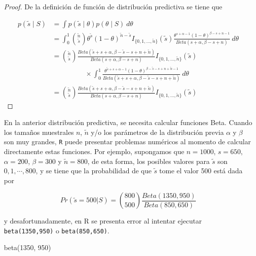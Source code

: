 \documentclass[
  10pt,
  spanish,
]{book}
\newenvironment{Shaded}{\begin{snugshade}}{\end{snugshade}}
\newcommand{\DecValTok}[1]{\textcolor[rgb]{0.00,0.00,0.81}{#1}}
\newcommand{\FunctionTok}[1]{\textcolor[rgb]{0.00,0.00,0.00}{#1}}
\newcommand{\NormalTok}[1]{#1}
\theoremstyle{definition}
\theoremstyle{definition}
\theoremstyle{definition}
\theoremstyle{definition}
\theoremstyle{remark}
\begin{document}
\begin{proof}
\iffalse{} {Prueba. } \fi{}De la definición de función de distribución predictiva se tiene que

\begin{align*}
p(\tilde{s} \mid S)&=\int p(\tilde{s} \mid \theta)p(\theta \mid S)\ d\theta\\
&=\int_0^1 \binom{\tilde{n}}{\tilde{s}} \theta^{\tilde{s}}(1-\theta)^{\tilde{n}-\tilde{s}}I_{\{0,1,\ldots,\tilde{n}\}}(\tilde{s})
\frac{\theta^{s+\alpha-1}(1-\theta)^{\beta-s+n-1}}{Beta(s+\alpha,\beta-s+n)}\ d\theta\\
&=\binom{\tilde{n}}{\tilde{s}}\frac{Beta(\tilde{s}+s+\alpha,\beta-\tilde{s}-s+n+\tilde{n})}{Beta(s+\alpha,\beta-s+n)}I_{\{0,1,\ldots,\tilde{n}\}}(\tilde{s})\\
& \hspace{2cm}\times
\int_0^1\frac{\theta^{\tilde{s}+s+\alpha-1}(1-\theta)^{\beta-\tilde{s}-s+n+\tilde{n}-1}}
{Beta(\tilde{s}+s+\alpha,\beta-\tilde{s}-s+n+\tilde{n})}\ d\theta\\
&=\binom{\tilde{n}}{\tilde{s}}\frac{Beta(\tilde{s}+s+\alpha,\beta-\tilde{s}-s+n+\tilde{n})}{Beta(s+\alpha,\beta-s+n)}I_{\{0,1,\ldots,\tilde{n}\}}(\tilde{s})
\end{align*}
\end{proof}

En la anterior distribución predictiva, se necesita calcular funciones
Beta. Cuando los tamaños muestrales \(n\), \(\tilde{n}\) y/o los
parámetros de la distribución previa \(\alpha\) y \(\beta\) son muy grandes,
\texttt{R} puede presentar problemas numéricos al momento de calcular directamente estas funciones. Por ejemplo, supongamos que \(n=1000\), \(s=650\), \(\alpha=200\), \(\beta=300\) y \(\tilde{n}=800\), de esta forma, los posibles
valores para \(\tilde{s}\) son \(0,1,\cdots,800\), y se tiene que la
probabilidad de que \(\tilde{s}\) tome el valor 500 está dada por

\begin{equation}
\label{eq:Ejebinom}
Pr(\tilde{s}=500|S)=
\binom{800}{500}\frac{Beta(1350,950)}{Beta(850,650)}
\end{equation}

y desafortunadamente, en \textsf{R} se presenta error al intentar
ejecutar \texttt{beta(1350,950)} o \texttt{beta(850,650)}.

\begin{Shaded}
\begin{Highlighting}[]
\FunctionTok{beta}\NormalTok{(}\DecValTok{1350}\NormalTok{, }\DecValTok{950}\NormalTok{)}
\end{Highlighting}
\end{Shaded}
\end{document}
